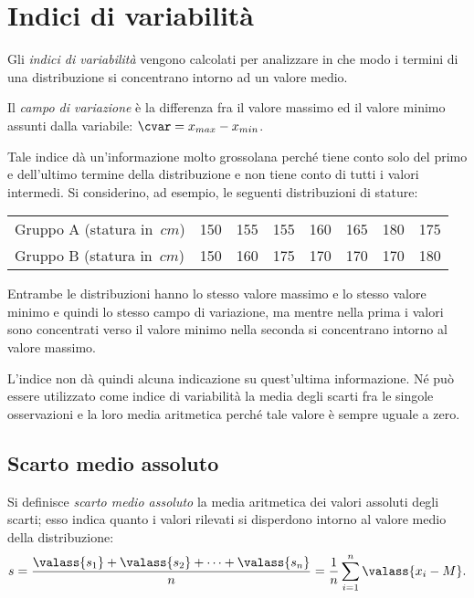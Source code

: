 \ovalbox{\risolvii \ref{ese:A.21}, \ref{ese:A.22}, \ref{ese:A.23}, \ref{ese:A.24}, \ref{ese:A.25}, \ref{ese:A.26}, \ref{ese:A.27}, \ref{ese:A.28}, \ref{ese:A.29}, \ref{ese:A.30}, \ref{ese:A.31}}

\vspazio\ovalbox{\ref{ese:A.32}}
\section{Indici di variabilità}

Gli \emph{indici di variabilità} vengono calcolati per analizzare in che modo i termini di una distribuzione si concentrano intorno ad un valore medio.

\begin{definizione}
Il \emph{campo di variazione} è la differenza fra il valore massimo ed il valore minimo assunti dalla
variabile: $\cvar = x_{max} - x_{min}$.
\end{definizione}

Tale indice dà un'informazione molto grossolana perché tiene conto solo del primo e dell'ultimo termine della
distribuzione e non tiene conto di tutti i valori intermedi. Si considerino, ad esempio, le seguenti distribuzioni di stature:
\begin{center}
 \begin{tabular}{lccccccc}
 \toprule
 Gruppo A (statura in~$\unit{cm}$) & 150 & 155 & 155 & 160 & 165 & 180 & 175 \\
 Gruppo B (statura in~$\unit{cm}$) & 150 & 160 & 175 & 170 & 170 & 170 & 180 \\
 \bottomrule
\end{tabular}
\end{center}

Entrambe le distribuzioni hanno lo stesso valore massimo e lo stesso valore minimo e quindi lo stesso campo di
variazione, ma mentre nella prima i valori sono concentrati verso il valore minimo nella seconda si concentrano intorno al valore massimo.

L'indice non dà quindi alcuna indicazione su quest'ultima informazione. Né può essere utilizzato come indice di
variabilità la media degli scarti fra le singole osservazioni e la loro media aritmetica perché tale valore è sempre uguale a zero.

\subsection{Scarto medio assoluto}

\begin{definizione}
Si definisce \emph{scarto medio assoluto} la media aritmetica dei valori assoluti degli scarti; esso indica quanto i valori rilevati si disperdono
intorno al valore medio della distribuzione:
\[s=\frac{\valass{s_1}+\valass{s_2}+ \cdots +\valass{s_n}}{n}=\frac {1}{n}\sum_{i=1}^n \valass{x_i - M}.\]
\end{definizione}

